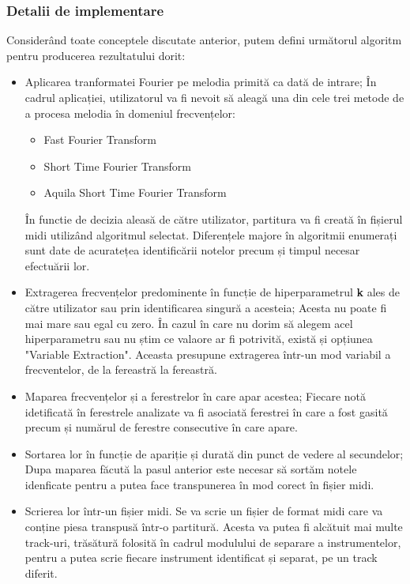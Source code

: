 \documentclass[a4paper,12pt]{report}
\begin{document}
    \clearpage
    \subsubsection{Detalii de implementare}
    Considerând toate conceptele discutate anterior, putem defini următorul algoritm pentru producerea rezultatului dorit:
    
    \begin{itemize}
    	\item Aplicarea tranformatei Fourier pe melodia primită ca dată de intrare; În cadrul aplicației, utilizatorul va fi nevoit să aleagă una din cele trei metode de a procesa melodia în domeniul frecvențelor:
    	\begin{itemize}
    		\item Fast Fourier Transform
    		\item Short Time Fourier Transform
    		\item Aquila Short Time Fourier Transform
    	\end{itemize}
    	În functie de decizia aleasă de către utilizator, partitura va fi creată în fișierul midi utilizând algoritmul selectat. Diferențele majore în algoritmii enumerați sunt date de acuratețea identificării notelor precum și timpul necesar efectuării lor.
    	\item Extragerea frecvențelor predominente în funcție de hiperparametrul \textbf{k} ales de către utilizator sau prin identificarea singură a acesteia; Acesta nu poate fi mai mare sau egal cu zero. În cazul în care nu dorim să alegem acel hiperparametru sau nu știm ce valaore ar fi potrivită, există și opțiunea "Variable Extraction". Aceasta presupune extragerea într-un mod variabil a frecventelor, de la fereastră la fereastră.
    	\item Maparea frecvențelor și a ferestrelor în care apar acestea; Fiecare notă idetificată în ferestrele analizate va fi asociată ferestrei în care a fost gasită precum și numărul de ferestre consecutive în care apare.
    	\item Sortarea lor în funcție de apariție și durată din punct de vedere al secundelor; Dupa maparea făcută la pasul anterior este necesar să sortăm notele idenficate pentru a putea face transpunerea în mod corect în fișier midi. 
    	\item Scrierea lor într-un fișier midi. Se va scrie un fișier de format midi care va conține piesa transpusă într-o partitură. Acesta va putea fi alcătuit mai multe track-uri, trăsătură folosită în cadrul modulului de separare a instrumentelor, pentru a putea scrie fiecare instrument identificat și separat, pe un track diferit.
    \end{itemize}
\end{document}
